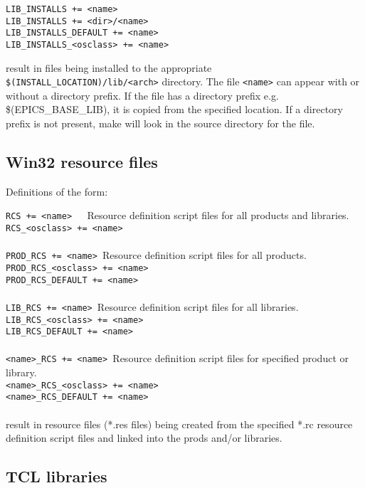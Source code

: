 \begin{verbatim}
LIB_INSTALLS += <name>
LIB_INSTALLS += <dir>/<name>
LIB_INSTALLS_DEFAULT += <name>
LIB_INSTALLS_<osclass> += <name>
\end{verbatim}

result in files being installed to the appropriate \verb|$(INSTALL_LOCATION)/lib/<arch>| directory. The file \verb|<name>| can 
appear with or without a directory prefix. If the file has a directory prefix e.g. \$(EPICS\_BASE\_LIB), it is copied from the 
specified location. If a directory prefix is not present, make will look in the source directory for the file.

\subsection{Win32 resource files}

Definitions of the form:

\noindent\verb|RCS += <name>   |Resource definition script files for all products and libraries.\\
\verb|RCS_<osclass> += <name>|\\
\verb||\\
\verb|PROD_RCS += <name> |Resource definition script files for all products.\\
\verb|PROD_RCS_<osclass> += <name>|\\
\verb|PROD_RCS_DEFAULT += <name>|\\
\verb||\\
\verb|LIB_RCS += <name> |Resource definition script files for all libraries.\\
\verb|LIB_RCS_<osclass> += <name>|\\
\verb|LIB_RCS_DEFAULT += <name>|\\
\verb||\\
\verb|<name>_RCS += <name> |Resource definition script files for specified product or library.\\
\verb|<name>_RCS_<osclass> += <name>|\\
\verb|<name>_RCS_DEFAULT += <name>|\\
\verb||\\
result in resource files (*.res files) being created from the specified *.rc resource definition script files and linked into the 
prods and/or libraries.

\subsection{TCL libraries}

